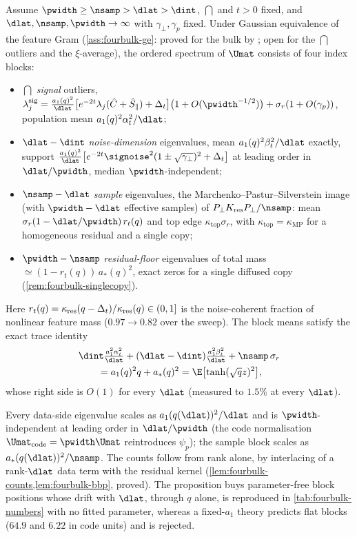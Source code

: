\begin{proposition}\label{prop:fourbulk-main}
Assume $\pwidth\ge\nsamp>\dlat>\dint$, $\dint$ and $t>0$ fixed, and $\dlat,\nsamp,\pwidth\to\infty$ with $\gamma_\perp,\gamma_p$ fixed. Under Gaussian equivalence of the feature Gram (\cref{ass:fourbulk-ge}: proved for the bulk by \citealp{louart2018random,liao2018spectrum}; open for the $\dint$ outliers and the $\xi$-average), the ordered spectrum of $\Umat$ consists of four index blocks:
\begin{itemize}\setlength\itemsep{0pt}
\item[(i)] $\dint$ \emph{signal} outliers, $\lambda^{\mathrm{sig}}_j=\tfrac{a_1(q)^2}{\dlat}\bigl[e^{-2t}\lambda_j(\hat C+\hat S_\parallel)+\Delta_t\bigr]\bigl(1+O(\pwidth^{-1/2})\bigr)+\sigma_r(1+O(\gamma_p))$, population mean $a_1(q)^2\alpha_t^2/\dlat$;
\item[(ii)] $\dlat-\dint$ \emph{noise-dimension} eigenvalues, mean $a_1(q)^2\beta_t^2/\dlat$ exactly, support $\tfrac{a_1(q)^2}{\dlat}\bigl[e^{-2t}\signoise^2(1\pm\sqrt{\gamma_\perp})^2+\Delta_t\bigr]$ at leading order in $\dlat/\pwidth$, median $\pwidth$-independent;
\item[(iii)] $\nsamp-\dlat$ \emph{sample} eigenvalues, the Marchenko--Pastur--Silverstein image (with $\pwidth-\dlat$ effective samples) of $P_\perp K_{\mathrm{res}}P_\perp/\nsamp$: mean $\sigma_r(1-\dlat/\pwidth)\,r_t(q)$ and top edge $\kappa_{\mathrm{top}}\sigma_r$, with $\kappa_{\mathrm{top}}=\kappa_{\mathrm{MP}}$ for a homogeneous residual and a single copy;
\item[(iv)] $\pwidth-\nsamp$ \emph{residual-floor} eigenvalues of total mass $\simeq(1-r_t(q))\,a_*(q)^2$, exact zeros for a single diffused copy (\cref{rem:fourbulk-singlecopy}).
\end{itemize}
Here $r_t(q)=\kappa_{\rm res}(q-\Delta_t)/\kappa_{\rm res}(q)\in(0,1]$ is the noise-coherent fraction of nonlinear feature mass ($0.97\to0.82$ over the sweep). The block means satisfy the exact trace identity
\begin{align}
&\dint\tfrac{a_1^2\alpha_t^2}{\dlat}+(\dlat-\dint)\tfrac{a_1^2\beta_t^2}{\dlat}+\nsamp\,\sigma_r\nonumber\\
&\qquad=a_1(q)^2q+a_*(q)^2=\E\bigl[\tanh(\sqrt qz)^2\bigr],\label{eq:fourbulk-trace-main}
\end{align}
whose right side is $O(1)$ for every $\dlat$ (measured to $1.5\%$ at every $\dlat$).
\end{proposition}
Every data-side eigenvalue scales as $a_1(q(\dlat))^2/\dlat$ and is $\pwidth$-independent at leading order in $\dlat/\pwidth$ (the code normalisation $\Umat_{\rm code}=\pwidth\Umat$ reintroduces $\psi_p$); the sample block scales as $a_*(q(\dlat))^2/\nsamp$. The counts follow from rank alone, by interlacing of a rank-$\dlat$ data term with the residual kernel (\cref{lem:fourbulk-counts,lem:fourbulk-bbp}, proved). The proposition buys parameter-free block positions whose drift with $\dlat$, through $q$ alone, is reproduced in \cref{tab:fourbulk-numbers} with no fitted parameter, whereas a fixed-$a_1$ theory predicts flat blocks ($64.9$ and $6.22$ in code units) and is rejected.

